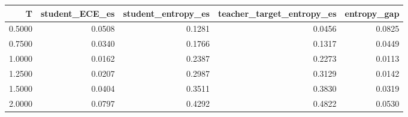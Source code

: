 \begin{tabular}{rrrrr}
\toprule
T & student_ECE_es & student_entropy_es & teacher_target_entropy_es & entropy_gap \\
\midrule
0.5000 & 0.0508 & 0.1281 & 0.0456 & 0.0825 \\
0.7500 & 0.0340 & 0.1766 & 0.1317 & 0.0449 \\
1.0000 & 0.0162 & 0.2387 & 0.2273 & 0.0113 \\
1.2500 & 0.0207 & 0.2987 & 0.3129 & 0.0142 \\
1.5000 & 0.0404 & 0.3511 & 0.3830 & 0.0319 \\
2.0000 & 0.0797 & 0.4292 & 0.4822 & 0.0530 \\
\bottomrule
\end{tabular}
